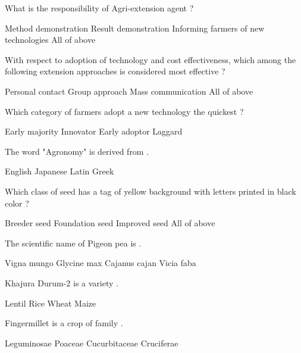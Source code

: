 \begin{questions}
\question What is the responsibility of Agri-extension agent ?
  \begin{choices}
  \choice Method demonstration
  \choice Result demonstration
  \choice Informing farmers of new technologies
  \choice All of above
  \end{choices}

\question With respect to adoption of technology and cost effectiveness, which among the following extension approaches is considered most effective ?
  \begin{choices}
  \choice Personal contact
  \choice Group approach
  \choice Mass communication
  \choice All of above
  \end{choices}

\question Which category of farmers adopt a new technology the quickest ?
  \begin{choices}
  \choice Early majority
  \CorrectChoice Innovator
  \choice Early adoptor
  \choice Laggard
  \end{choices}

\question The word "Agronomy" is derived from \fillin[][3cm].
  \begin{choices}
  \choice English
  \choice Japanese
  \choice Latin
  \choice Greek
  \end{choices}

\question Which class of seed has a tag of yellow background with letters printed in black color ?
  \begin{choices}
  \choice Breeder seed
  \choice Foundation seed
  \CorrectChoice Improved seed
  \choice All of above
  \end{choices}

\question The scientific name of Pigeon pea is \fillin[][3cm].
  \begin{choices}
  \choice Vigna mungo
  \choice Glycine max
  \CorrectChoice Cajanus cajan
  \choice Vicia faba
  \end{choices}

\question Khajura Durum-2 is a variety \fillin[][3cm].
  \begin{choices}
  \choice Lentil
  \choice Rice
  \CorrectChoice Wheat
  \choice Maize
  \end{choices}

\question Fingermillet is a crop of family \fillin[][3cm].
  \begin{choices}
  \choice Leguminosae
  \CorrectChoice Poaceae
  \choice Cucurbitaceae
  \choice Cruciferae
  \end{choices}


\end{questions}

